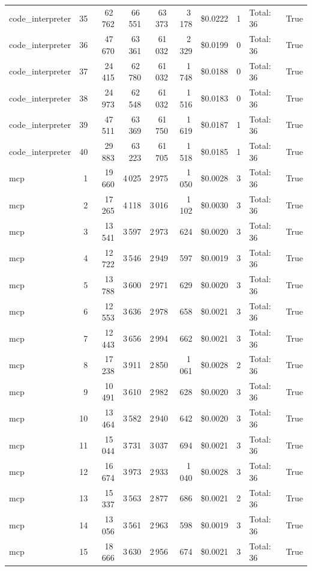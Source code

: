 \documentclass[a4paper,11pt]{article}
\begin{document}
\begin{table}[H]
{\begin{tabular}{l r r r r r r r l r}
code\_interpreter & 35 & 62\,762 & 66\,551 & 63\,373 & 3\,178 & \$0.0222 & 1 & Total: 36 & True \\
code\_interpreter & 36 & 47\,670 & 63\,361 & 61\,032 & 2\,329 & \$0.0199 & 0 & Total: 36 & True \\
code\_interpreter & 37 & 24\,415 & 62\,780 & 61\,032 & 1\,748 & \$0.0188 & 0 & Total: 36 & True \\
code\_interpreter & 38 & 24\,973 & 62\,548 & 61\,032 & 1\,516 & \$0.0183 & 0 & Total: 36 & True \\
code\_interpreter & 39 & 47\,511 & 63\,369 & 61\,750 & 1\,619 & \$0.0187 & 1 & Total: 36 & True \\
code\_interpreter & 40 & 29\,883 & 63\,223 & 61\,705 & 1\,518 & \$0.0185 & 1 & Total: 36 & True \\
\midrule
mcp & 1 & 19\,660 & 4\,025 & 2\,975 & 1\,050 & \$0.0028 & 3 & Total: 36 & True \\
mcp & 2 & 17\,265 & 4\,118 & 3\,016 & 1\,102 & \$0.0030 & 3 & Total: 36 & True \\
mcp & 3 & 13\,541 & 3\,597 & 2\,973 & 624 & \$0.0020 & 3 & Total: 36 & True \\
mcp & 4 & 12\,722 & 3\,546 & 2\,949 & 597 & \$0.0019 & 3 & Total: 36 & True \\
mcp & 5 & 13\,788 & 3\,600 & 2\,971 & 629 & \$0.0020 & 3 & Total: 36 & True \\
mcp & 6 & 12\,553 & 3\,636 & 2\,978 & 658 & \$0.0021 & 3 & Total: 36 & True \\
mcp & 7 & 12\,443 & 3\,656 & 2\,994 & 662 & \$0.0021 & 3 & Total: 36 & True \\
mcp & 8 & 17\,238 & 3\,911 & 2\,850 & 1\,061 & \$0.0028 & 2 & Total: 36 & True \\
mcp & 9 & 10\,491 & 3\,610 & 2\,982 & 628 & \$0.0020 & 3 & Total: 36 & True \\
mcp & 10 & 13\,464 & 3\,582 & 2\,940 & 642 & \$0.0020 & 3 & Total: 36 & True \\
mcp & 11 & 15\,044 & 3\,731 & 3\,037 & 694 & \$0.0021 & 3 & Total: 36 & True \\
mcp & 12 & 16\,674 & 3\,973 & 2\,933 & 1\,040 & \$0.0028 & 3 & Total: 36 & True \\
mcp & 13 & 15\,337 & 3\,563 & 2\,877 & 686 & \$0.0021 & 2 & Total: 36 & True \\
mcp & 14 & 13\,056 & 3\,561 & 2\,963 & 598 & \$0.0019 & 3 & Total: 36 & True \\
mcp & 15 & 18\,666 & 3\,630 & 2\,956 & 674 & \$0.0021 & 3 & Total: 36 & True \\

\end{tabular}}
\end{table}
\end{document}
